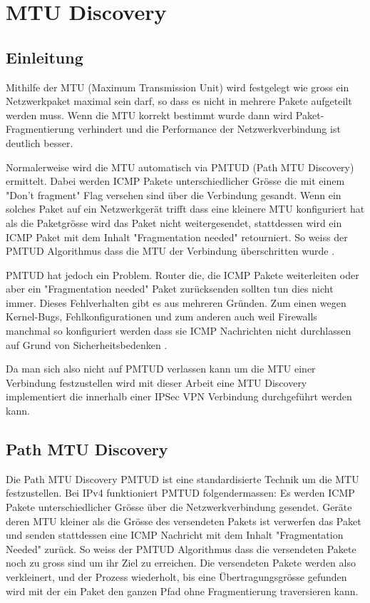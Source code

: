 \section{MTU Discovery}
\label{sec:MTU Discovery}

\subsection{Einleitung}
Mithilfe der \acs{MTU} (Maximum Transmission Unit) wird festgelegt wie gross ein Netzwerkpaket maximal sein darf, so dass es nicht in mehrere Pakete aufgeteilt werden muss. Wenn die \acs{MTU} korrekt bestimmt wurde dann wird Paket-Fragmentierung verhindert und die Performance der Netzwerkverbindung ist deutlich besser. 

Normalerweise wird die \acs{MTU} automatisch via \acs{PMTUD} (Path MTU Discovery) ermittelt. Dabei werden \acs{ICMP} Pakete unterschiedlicher Grösse die mit einem "Don't fragment" Flag versehen sind über die Verbindung gesandt. Wenn ein solches Paket auf ein Netzwerkgerät trifft dass eine kleinere \acs{MTU} konfiguriert hat als die Paketgrösse wird das Paket nicht weitergesendet, stattdessen wird ein \acs{ICMP} Paket mit dem Inhalt "Fragmentation needed" retourniert. So weiss der \acs{PMTUD} Algorithmus dass die \acs{MTU} der Verbindung überschritten wurde \cite[:131]{rfc1191}.

\acs{PMTUD} hat jedoch ein Problem. Router die, die \acs{ICMP} Pakete weiterleiten oder aber ein "Fragmentation needed" Paket zurücksenden sollten tun dies nicht immer. Dieses Fehlverhalten gibt es aus mehreren Gründen. Zum einen wegen Kernel-Bugs, Fehlkonfigurationen und zum anderen auch weil Firewalls manchmal so konfiguriert werden dass sie \acs{ICMP} Nachrichten nicht durchlassen auf Grund von Sicherheitsbedenken \cite[:137]{rfc2923}.

Da man sich also nicht auf \acs{PMTUD} verlassen kann um die \acs{MTU} einer Verbindung festzustellen wird mit dieser Arbeit eine \acs{MTU} Discovery implementiert die innerhalb einer \acs{IPSec} \acs{VPN} Verbindung durchgeführt werden kann.

\subsection{Path MTU Discovery}
Die Path MTU Discovery \acs{PMTUD} ist eine standardisierte Technik um die \acs{MTU} festzustellen.  Bei \acs{IPv4} funktioniert \acs{PMTUD} folgendermassen: Es werden \acs{ICMP} Pakete unterschiedlicher Grösse über die Netzwerkverbindung gesendet. Geräte deren \acs{MTU} kleiner als die Grösse des versendeten Pakets ist verwerfen das Paket und senden stattdessen eine \acs{ICMP} Nachricht mit dem Inhalt "Fragmentation Needed" zurück. So weiss der \acs{PMTUD} Algorithmus dass die versendeten Pakete noch zu gross sind um ihr Ziel zu erreichen. Die versendeten Pakete werden also verkleinert, und der Prozess wiederholt, bis eine Übertragungsgrösse gefunden wird mit der ein Paket den ganzen Pfad ohne Fragmentierung traversieren kann.

